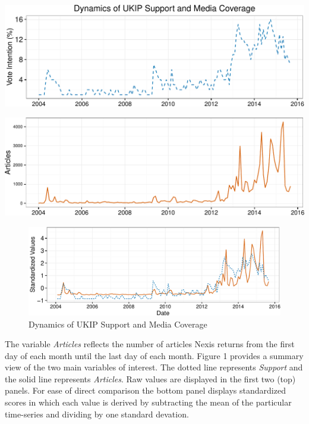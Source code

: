 \documentclass[12pt,article]{article}
\begin{document}
\setlength\parindent{0pt}

\includegraphics{ukip_media_files/figure-latex/unnamed-chunk-1-1.pdf}

\includegraphics{ukip_media_files/figure-latex/unnamed-chunk-2-1.pdf}

\begin{figure}[htbp]
\centering
\includegraphics{ukip_media_files/figure-latex/unnamed-chunk-3-1.pdf}
\caption{Dynamics of UKIP Support and Media Coverage}
\end{figure}

\setlength\parindent{24pt}

The variable \emph{Articles} reflects the number of articles Nexis
returns from the first day of each month until the last day of each
month. Figure 1 provides a summary view of the two main variables of
interest. The dotted line represents \emph{Support} and the solid line
represents \emph{Articles}. Raw values are displayed in the first two
(top) panels. For ease of direct comparison the bottom panel displays
standardized scores in which each value is derived by subtracting the
mean of the particular time-series and dividing by one standard
devation.
\end{document}
